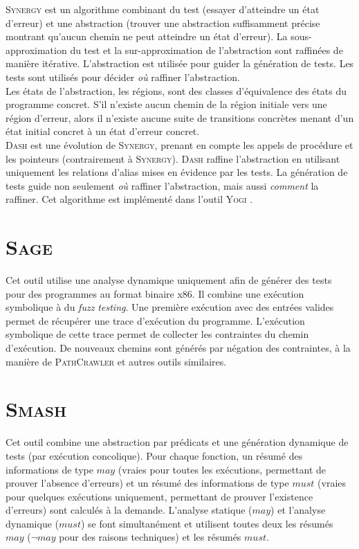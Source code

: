 \textsc{Synergy} \cite{SYNERGY} est un algorithme combinant du test (essayer
d'atteindre un état d'erreur) et une abstraction (trouver une abstraction
suffisamment précise montrant qu'aucun chemin ne peut atteindre un état
d'erreur). La sous-approximation du test et la sur-approximation de
l'abstraction sont raffinées de manière itérative. L'abstraction est utilisée
pour guider la génération de tests. Les tests sont utilisés pour décider
{\em où} raffiner l'abstraction.\\

Les états de l'abstraction, les régions, sont des classes d'équivalence des
états du programme concret. S'il n'existe aucun chemin de la région initiale
vers une région d'erreur, alors il n'existe aucune suite de transitions
concrètes menant d'un état initial concret à un état d'erreur concret.\\

\textsc{Dash} \cite{DASH} est une évolution de \textsc{Synergy}, prenant en
compte les appels de procédure et les pointeurs (contrairement à
\textsc{Synergy}). \textsc{Dash} raffine l'abstraction en utilisant uniquement
les relations d'alias mises en évidence par les tests. La génération de tests
guide non seulement {\em où} raffiner l'abstraction, mais aussi {\em comment}
la raffiner. Cet algorithme est implémenté dans l'outil \textsc{Yogi}
\cite{YOGI}.

\section{\textsc{Sage}}

Cet outil \cite{SAGE} utilise une analyse dynamique uniquement afin de générer
des tests pour des programmes au format binaire x86. Il combine une exécution
symbolique à du {\em fuzz testing}. Une première exécution avec des entrées
valides permet de récupérer une trace d'exécution du programme. L'exécution
symbolique de cette trace permet de collecter les contraintes du chemin
d'exécution. De nouveaux chemins sont générés par négation des contraintes,
à la manière de \textsc{PathCrawler} \cite{PathCrawler} et autres outils
similaires.

\section{\textsc{Smash}}

Cet outil \cite{SMASH} combine une abstraction par prédicats et une génération
dynamique de tests (par exécution concolique). Pour chaque fonction, un résumé
des informations de type $may$ (vraies pour toutes les exécutions, permettant de
prouver l'absence d'erreurs) et un résumé des informations de type $must$
(vraies pour quelques exécutions uniquement, permettant de prouver l'existence
d'erreurs) sont calculés à la demande. L'analyse statique ($may$) et l'analyse
dynamique ($must$) se font simultanément et utilisent toutes deux les résumés
$may$ ($\lnot may$ pour des raisons techniques) et les résumés $must$.\\

